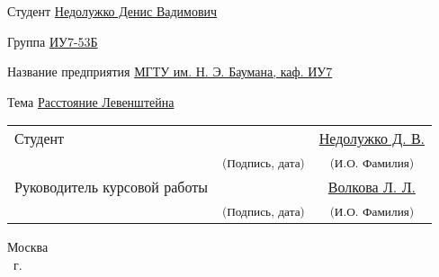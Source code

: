 \begin{titlepage}
    \begin{flushleft}
        Студент \uline{\hfill Недолужко Денис Вадимович \hfill}
        
        Группа \uline{\hfill ИУ7-53Б \hfill}
        
        Название предприятия \uline{\hfill МГТУ им. Н. Э. Баумана, каф. ИУ7  \hfill}
        
        Тема \uline{\hfill Расстояние Левенштейна \hfill}
    \end{flushleft}
    
    \vfill
    
    \begin{flushleft}
    \begin{tabularx}{\textwidth}{Xcc}
      Студент& \uline{\hfill} &  \hfill\uline{Недолужко Д. В.}\\
      &\textsuperscript{\scriptsize{(Подпись, дата)}}&\textsuperscript{\scriptsize{(И.О. Фамилия)}}\\
      Руководитель курсовой работы & \uline{\hfill} & \uline{Волкова Л. Л.}\\
      &\textsuperscript{\scriptsize{(Подпись, дата)}}&\textsuperscript{\scriptsize{(И.О. Фамилия)}}\\
    \end{tabularx}
    \end{flushleft}
    
    \vfill
    
    \begin{center}
        \normalsize Москва \\
        \the\year ~г.
    \end{center}
\end{titlepage}